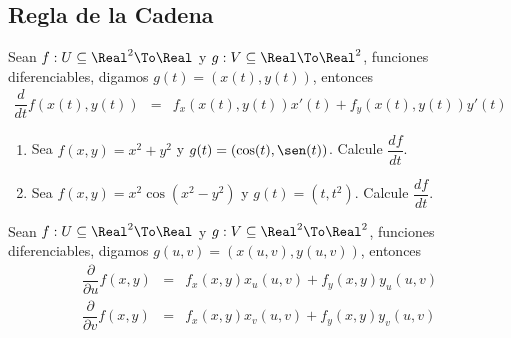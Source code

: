 \subsection{Regla de la Cadena}
\begin{frame}
\subsectionpage
\end{frame}


\begin{frame}
  \begin{thm}
    Sean $f:U\subseteq\Real^2\To\Real$ y $g:V\subseteq\Real\To\Real^2$, funciones diferenciables, digamos $g(t)=(x(t),y(t))$, entonces
    \begin{eqnarray*}
      \dfrac{d}{dt}f(x(t),y(t)) &=& f_x(x(t),y(t))x'(t)+f_y(x(t),y(t))y'(t)
    \end{eqnarray*}
  \end{thm}
\end{frame}

\begin{frame}
  \begin{egs}
    \begin{enumerate}[<+->]
      \item Sea $f(x,y)=x^2+y^2$ y $g(t)=(\cos(t),\sen(t))$. Calcule $\dfrac{df}{dt}$.\\[0.5cm]
      \item Sea $f(x,y)=x^2\cos(x^2-y^2)$ y $g(t)=(t,t^2)$. Calcule $\dfrac{df}{dt}$.
    \end{enumerate}
  \end{egs}
\end{frame}

\begin{frame}
  \begin{thm}
    Sean $f:U\subseteq\Real^2\To\Real$ y $g:V\subseteq\Real^2\To\Real^2$, funciones diferenciables, digamos $g(u,v)=(x(u,v),y(u,v))$, entonces
    \begin{eqnarray*}
      \dfrac{\partial}{\partial u}f(x,y) &=& f_x(x,y)x_u(u,v)+f_y(x,y)y_u(u,v)\\
      \dfrac{\partial}{\partial v}f(x,y) &=& f_x(x,y)x_v(u,v)+f_y(x,y)y_v(u,v)
    \end{eqnarray*}
  \end{thm}
\end{frame}

